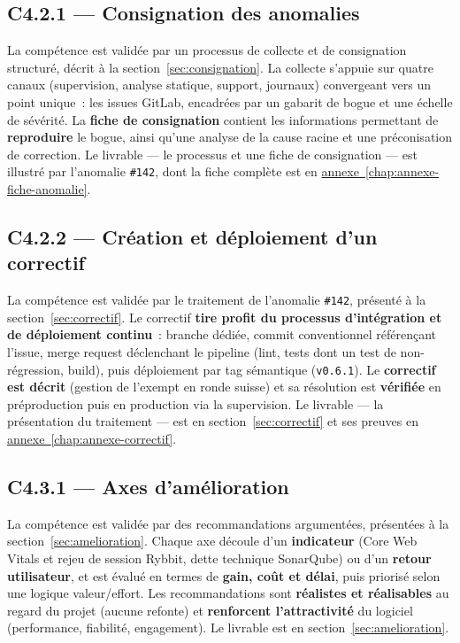 \subsection*{C4.2.1 --- Consignation des anomalies}
La compétence est validée par un processus de collecte et de consignation structuré, décrit à la section~\ref*{sec:consignation}. La collecte s'appuie sur quatre canaux (supervision, analyse statique, support, journaux) convergeant vers un point unique~: les issues GitLab, encadrées par un gabarit de bogue et une échelle de sévérité. La \textbf{fiche de consignation} contient les informations permettant de \textbf{reproduire} le bogue, ainsi qu'une analyse de la cause racine et une préconisation de correction. Le livrable — le processus et une fiche de consignation — est illustré par l'anomalie \texttt{\#142}, dont la fiche complète est en \hyperref[chap:annexe-fiche-anomalie]{annexe~\ref*{chap:annexe-fiche-anomalie}}.

\subsection*{C4.2.2 --- Création et déploiement d'un correctif}
La compétence est validée par le traitement de l'anomalie \texttt{\#142}, présenté à la section~\ref*{sec:correctif}. Le correctif \textbf{tire profit du processus d'intégration et de déploiement continu}~: branche dédiée, commit conventionnel référençant l'issue, merge request déclenchant le pipeline (lint, tests dont un test de non-régression, build), puis déploiement par tag sémantique (\texttt{v0.6.1}). Le \textbf{correctif est décrit} (gestion de l'exempt en ronde suisse) et sa résolution est \textbf{vérifiée} en préproduction puis en production via la supervision. Le livrable — la présentation du traitement — est en section~\ref*{sec:correctif} et ses preuves en \hyperref[chap:annexe-correctif]{annexe~\ref*{chap:annexe-correctif}}.

\subsection*{C4.3.1 --- Axes d'amélioration}
La compétence est validée par des recommandations argumentées, présentées à la section~\ref*{sec:amelioration}. Chaque axe découle d'un \textbf{indicateur} (Core Web Vitals et rejeu de session Rybbit, dette technique SonarQube) ou d'un \textbf{retour utilisateur}, et est évalué en termes de \textbf{gain, coût et délai}, puis priorisé selon une logique valeur/effort. Les recommandations sont \textbf{réalistes et réalisables} au regard du projet (aucune refonte) et \textbf{renforcent l'attractivité} du logiciel (performance, fiabilité, engagement). Le livrable est en section~\ref*{sec:amelioration}.


